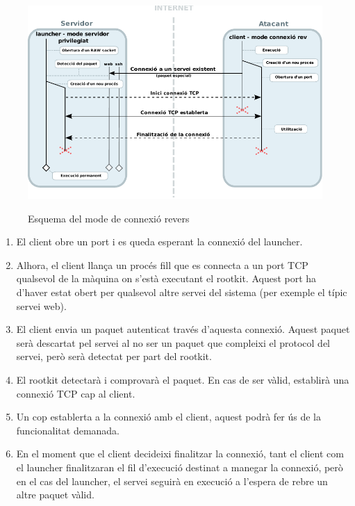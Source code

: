 \begin{figure}[htp]
    \centering
    \includegraphics[scale=1.2,keepaspectratio]{diagrames/solutionDesignPrivilegedServerModeREV.pdf} \\
    \caption{Esquema del mode de connexió revers}
    \label{fig:modePrivilegedServerREV}
\end{figure}

\begin{enumerate}
    \item El client obre un port i es queda esperant la connexió del launcher.
    \item Alhora, el client llança un procés fill que es connecta a un port TCP qualsevol de la màquina on s'està 
        executant el rootkit. Aquest port ha d'haver estat obert per qualsevol altre servei del sistema (per 
        exemple el típic servei web).
    \item El client envia un paquet autenticat través d'aquesta connexió. Aquest paquet serà   
        descartat pel servei al no ser un paquet que compleixi el protocol del servei, però serà detectat per
        part del rootkit. 
    \item El rootkit detectarà i comprovarà el paquet. En cas de ser vàlid, establirà una connexió TCP cap 
        al client.
    \item Un cop establerta a la connexió amb el client, aquest podrà fer ús de la funcionalitat demanada. 
    \item En el moment que el client decideixi finalitzar la connexió, tant el client com el launcher finalitzaran el
        fil d'execució destinat a manegar la connexió, però en el cas del launcher, el servei seguirà en execució
        a l'espera de rebre un altre paquet vàlid.
\end{enumerate}

